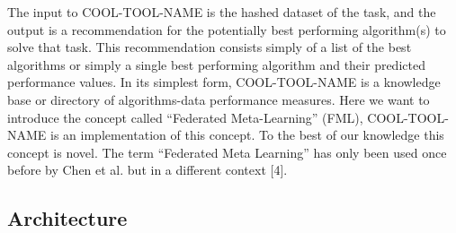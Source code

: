 \documentclass{article}
\begin{document}
The input to COOL-TOOL-NAME is the hashed dataset of the task, and the output is a recommendation for the potentially best performing algorithm(s) to solve that task. This recommendation consists simply of a list of the best algorithms or simply a single best performing algorithm and their predicted performance values. In its simplest form, COOL-TOOL-NAME is a knowledge base or directory of algorithms-data performance measures. Here we want to introduce the concept called “Federated Meta-Learning” (FML), COOL-TOOL-NAME is an implementation of this concept. To the best of our knowledge this concept is novel. The term “Federated Meta Learning” has only been used once before by Chen et al. but in a different context [4]. 

\subsection{Architecture}




\end{document}
